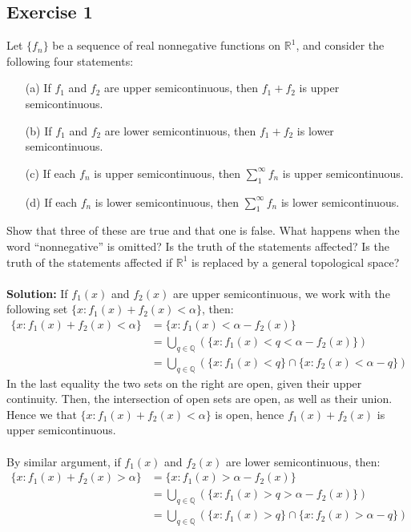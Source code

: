 \documentclass{article}
\begin{document}
\subsection*{Exercise 1}
Let $\{f_n\}$ be a sequence of real nonnegative functions on $\mathbb{R}^1$, and consider the following four statements:
\begin{enumerate}
    \item[(a)]  If $f_1$ and $f_2$ are upper semicontinuous, then $f_1 + f_2$ is upper semicontinuous.
    \item[(b)]  If $f_1$ and $f_2$ are lower semicontinuous, then $f_1 + f_2$ is lower semicontinuous.
    \item[(c)]  If each $f_n$ is upper semicontinuous, then $ \sum_1^{\infty} f_n$ is upper semicontinuous.
    \item[(d)]  If each $f_n$ is lower semicontinuous, then $ \sum_1^{\infty} f_n$ is lower semicontinuous.
\end{enumerate}
Show that three of these are true and that one is false. What happens when the word ``nonnegative'' is omitted? Is the truth of the
statements affected? Is the truth of the statements affected if $\mathbb{R}^1$ is replaced by a general topological space?
\\\\
\textbf{Solution:}
If $f_1(x)$ and $f_2(x)$ are upper semicontinuous, we work with the following set $\{ x: f_1(x) + f_2(x) < \alpha\}$, then:
\begin{equation*}
    \begin{aligned}
        \{ x: f_1(x) + f_2(x) < \alpha\} &= \{ x: f_1(x) < \alpha - f_2(x) \}\\
        &= \bigcup_{q \in \mathbb{Q}} (\{x:f_1(x) < q < \alpha - f_2(x)\})\\
        &= \bigcup_{q \in \mathbb{Q}} (\{x:f_1(x) < q\} \cap \{x:f_2(x) < \alpha - q\})
    \end{aligned}
\end{equation*}
In the last equality the two sets on the right are open, given their upper continuity. Then, the intersection of open sets are open, as well as their union.
Hence we that $\{ x: f_1(x) + f_2(x) < \alpha\}$ is open, hence $f_1(x) + f_2(x)$ is upper semicontinuous.
\\\\
By similar argument, if $f_1(x)$ and $f_2(x)$ are lower semicontinuous, then:
\begin{equation*}
    \begin{aligned}
        \{ x: f_1(x) + f_2(x) > \alpha\} &= \{ x: f_1(x) > \alpha - f_2(x) \}\\
        &= \bigcup_{q \in \mathbb{Q}} (\{x:f_1(x) > q > \alpha - f_2(x)\})\\
        &= \bigcup_{q \in \mathbb{Q}} (\{x:f_1(x) > q\} \cap \{x:f_2(x) > \alpha - q\})
    \end{aligned}
\end{equation*}
\end{document}
